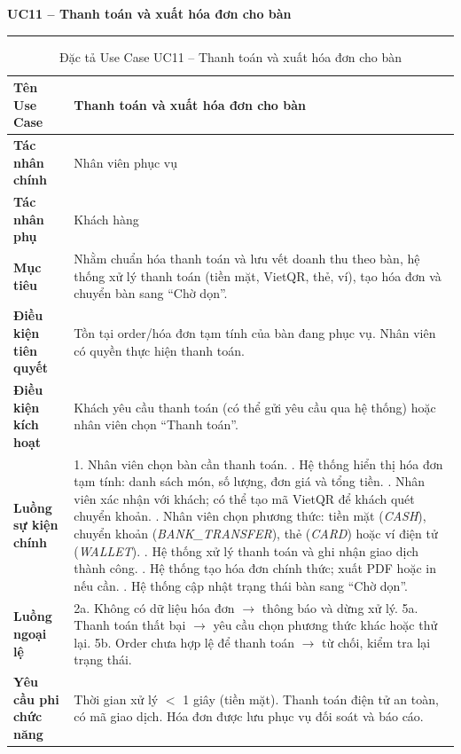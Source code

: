﻿\documentclass[../DoAn.tex]{subfiles}
\newcommand{\UCtitle}[1]{%
    \vspace{0.5em}
    {\large\bfseries #1}\\[-0.5em]
    \rule{\textwidth}{0.5pt}
    \vspace{0.3em}
}
\begin{document}
\begin{table}[H]
\UCtitle{UC11 – Thanh toán và xuất hóa đơn cho bàn}
\centering
\begin{tabular}{|p{4cm}|p{10.2cm}|}
\hline
\textbf{Tên Use Case} & Thanh toán và xuất hóa đơn cho bàn \\ \hline
\textbf{Tác nhân chính} & Nhân viên phục vụ \\ \hline
\textbf{Tác nhân phụ} & Khách hàng \\ \hline
\textbf{Mục tiêu} &
Nhằm chuẩn hóa thanh toán và lưu vết doanh thu theo bàn, hệ thống xử lý thanh toán (tiền mặt, VietQR, thẻ, ví), tạo hóa đơn và chuyển bàn sang ``Chờ dọn''.
\\ \hline
\textbf{Điều kiện tiên quyết} &
Tồn tại order/hóa đơn tạm tính của bàn đang phục vụ. Nhân viên có quyền thực hiện thanh toán.
\\ \hline
\textbf{Điều kiện kích hoạt} &
Khách yêu cầu thanh toán (có thể gửi yêu cầu qua hệ thống) hoặc nhân viên chọn ``Thanh toán''.
\\ \hline
\textbf{Luồng sự kiện chính} &
1. Nhân viên chọn bàn cần thanh toán. \newline
2. Hệ thống hiển thị hóa đơn tạm tính: danh sách món, số lượng, đơn giá và tổng tiền. \newline
3. Nhân viên xác nhận với khách; có thể tạo mã VietQR để khách quét chuyển khoản. \newline
4. Nhân viên chọn phương thức: tiền mặt (\textit{CASH}), chuyển khoản (\textit{BANK\_TRANSFER}), thẻ (\textit{CARD}) hoặc ví điện tử (\textit{WALLET}). \newline
5. Hệ thống xử lý thanh toán và ghi nhận giao dịch thành công. \newline
6. Hệ thống tạo hóa đơn chính thức; xuất PDF hoặc in nếu cần. \newline
7. Hệ thống cập nhật trạng thái bàn sang ``Chờ dọn''.
\\ \hline
\textbf{Luồng ngoại lệ} &
2a. Không có dữ liệu hóa đơn $\rightarrow$ thông báo và dừng xử lý. \newline
5a. Thanh toán thất bại $\rightarrow$ yêu cầu chọn phương thức khác hoặc thử lại. \newline
5b. Order chưa hợp lệ để thanh toán $\rightarrow$ từ chối, kiểm tra lại trạng thái.
\\ \hline
\textbf{Yêu cầu phi chức năng} &
Thời gian xử lý $<$ 1 giây (tiền mặt). Thanh toán điện tử an toàn, có mã giao dịch. Hóa đơn được lưu phục vụ đối soát và báo cáo.
\\ \hline
\end{tabular}
\caption{Đặc tả Use Case UC11 – Thanh toán và xuất hóa đơn cho bàn}
\end{table}
\end{document}
